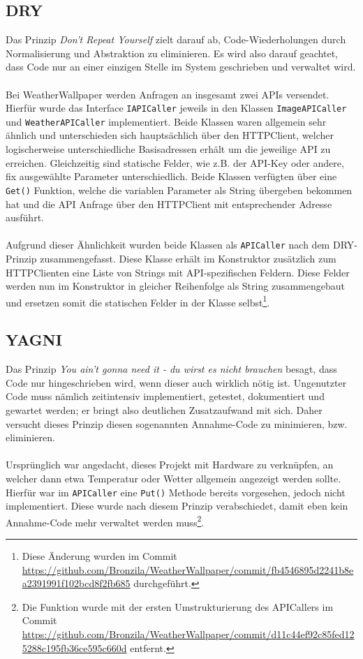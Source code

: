 \subsection{DRY}
Das Prinzip \textit{Don't Repeat Yourself} zielt darauf ab, Code-Wiederholungen durch Normalisierung und Abstraktion zu eliminieren.
Es wird also darauf geachtet, dass Code nur an einer einzigen Stelle im System geschrieben und verwaltet wird.\\
\\
Bei WeatherWallpaper werden Anfragen an insgesamt zwei APIs versendet.
Hierfür wurde das Interface \texttt{IAPICaller} jeweils in den Klassen \texttt{ImageAPICaller} und \texttt{WeatherAPICaller} implementiert.
Beide Klassen waren allgemein sehr ähnlich und unterschieden sich hauptsächlich über den HTTPClient, welcher logischerweise unterschiedliche Basisadressen erhält um die jeweilige API zu erreichen.
Gleichzeitig sind statische Felder, wie z.B. der API-Key oder andere, fix ausgewählte Parameter unterschiedlich.
Beide Klassen verfügten über eine \texttt{Get()} Funktion, welche die variablen Parameter als String übergeben bekommen hat und die API Anfrage über den HTTPClient mit entsprechender Adresse ausführt.\\
\\
Aufgrund dieser Ähnlichkeit wurden beide Klassen als \texttt{APICaller} nach dem DRY-Prinzip zusammengefasst.
Diese Klasse  erhält im Konstruktor zusätzlich zum HTTPClienten eine Liste von Strings mit API-spezifischen Feldern.
Diese Felder werden nun im Konstruktor in gleicher Reihenfolge als String zusammengebaut und ersetzen somit die statischen Felder in der Klasse selbst\footnote{Diese Änderung wurden im Commit \url{https://github.com/Bronzila/WeatherWallpaper/commit/fb4546895d2241b8ea2391991f102bcd8f2fb685} durchgeführt.}.
\subsection{YAGNI}
Das Prinzip \textit{You ain't gonna need it - du wirst es nicht brauchen} besagt, dass Code nur hingeschrieben wird, wenn dieser auch wirklich nötig ist.
Ungenutzter Code muss nämlich zeitintensiv implementiert, getestet, dokumentiert und gewartet werden; er bringt also deutlichen Zusatzaufwand mit sich.
Daher versucht dieses Prinzip diesen sogenannten Annahme-Code zu minimieren, bzw. eliminieren.\\
\\
Ursprünglich war angedacht, dieses Projekt mit Hardware zu verknüpfen, an welcher dann etwa Temperatur oder Wetter allgemein angezeigt werden sollte.
Hierfür war im \texttt{APICaller} eine \texttt{Put()} Methode bereits vorgesehen, jedoch nicht implementiert. 
Diese wurde nach diesem Prinzip verabschiedet, damit eben kein Annahme-Code mehr verwaltet werden muss\footnote{Die Funktion wurde mit der ersten Umstrukturierung des APICallers im Commit \url{https://github.com/Bronzila/WeatherWallpaper/commit/d11c44ef92c85fed125288c195fb36ce595c660d} entfernt.}.
